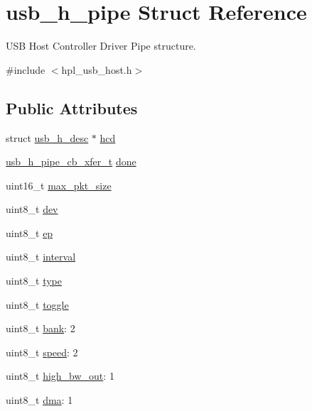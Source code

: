 \hypertarget{structusb__h__pipe}{}\section{usb\+\_\+h\+\_\+pipe Struct Reference}
\label{structusb__h__pipe}


U\+SB Host Controller Driver Pipe structure.  




{\ttfamily \#include $<$hpl\+\_\+usb\+\_\+host.\+h$>$}

\subsection*{Public Attributes}
\begin{DoxyCompactItemize}
\item 
struct \hyperlink{structusb__h__desc}{usb\+\_\+h\+\_\+desc} $\ast$ \hyperlink{structusb__h__pipe_ae2698ff783b82589f6cc5893d5662571}{hcd}
\item 
\hyperlink{hpl__usb__host_8h_a8797518a47a3477b6a65ed5358155078}{usb\+\_\+h\+\_\+pipe\+\_\+cb\+\_\+xfer\+\_\+t} \hyperlink{structusb__h__pipe_a42317c503317014d61b8773209f18ce7}{done}
\item 
uint16\+\_\+t \hyperlink{structusb__h__pipe_a4a9d0e10320b2a563bab23458798f4d8}{max\+\_\+pkt\+\_\+size}
\item 
uint8\+\_\+t \hyperlink{structusb__h__pipe_aabe6cb3a96961c2b5850a73c5bdfa8ca}{dev}
\item 
uint8\+\_\+t \hyperlink{structusb__h__pipe_a8b1b35e1b666e50e1f161fe9666083a6}{ep}
\item 
uint8\+\_\+t \hyperlink{structusb__h__pipe_a528fc668d035d4ed28dbce1ef6ac6d9d}{interval}
\item 
uint8\+\_\+t \hyperlink{structusb__h__pipe_a78c1a9f6df30f3e05576a16634d5d5c4}{type}
\item 
uint8\+\_\+t \hyperlink{structusb__h__pipe_a9b4ba000ae376cb0bf4636265b138023}{toggle}
\item 
uint8\+\_\+t \hyperlink{structusb__h__pipe_aa3815a946554f8bc314ed46f357cd847}{bank}\+: 2
\item 
uint8\+\_\+t \hyperlink{structusb__h__pipe_a02485226127cabe3dc5934ce660296cf}{speed}\+: 2
\item 
uint8\+\_\+t \hyperlink{structusb__h__pipe_ac6a51e6c8ab9685d75d3dff40d98f789}{high\+\_\+bw\+\_\+out}\+: 1
\item 
uint8\+\_\+t \hyperlink{structusb__h__pipe_aea4a85a3cbdcd530de56537deeabb243}{dma}\+: 1

\end{DoxyCompactItemize}
